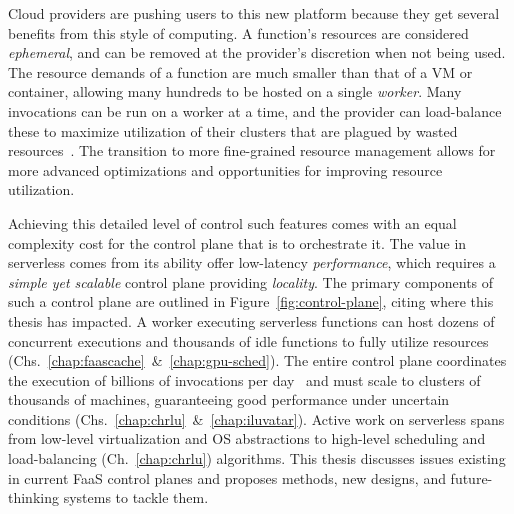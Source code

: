Cloud providers are pushing users to this new platform because they get several benefits from this style of computing.
A function's resources are considered \emph{ephemeral}, and can be removed at the provider's discretion when not being used.
The resource demands of a function are much smaller than that of a VM or container, allowing many hundreds to be hosted on a single \emph{worker}.
Many invocations can be run on a worker at a time, and the provider can load-balance these to maximize utilization of their clusters that are plagued by wasted resources~\cite{fuerst2020cloud,fuerst2022memory,wang2021smartharvest,serverless-harvest-sosp21,harvest-osdi20}.
The transition to more fine-grained resource management allows for more advanced optimizations and opportunities for improving resource utilization.

Achieving this detailed level of control such features comes with an equal complexity cost for the control plane that is to orchestrate it.
The value in serverless comes from its ability offer low-latency \emph{performance}, which requires a \emph{simple yet scalable} control plane providing \emph{locality}.
The primary components of such a control plane are outlined in Figure~\ref{fig:control-plane}, citing where this thesis has impacted.
A worker executing serverless functions can host dozens of concurrent executions and thousands of idle functions to fully utilize resources (Chs.~\ref{chap:faascache}~\&~\ref{chap:gpu-sched}).
The entire control plane coordinates the execution of billions of invocations per day~\cite{sahraei2023xfaas} and must scale to clusters of thousands of machines, guaranteeing good performance under uncertain conditions (Chs.~\ref{chap:chrlu}~\&~\ref{chap:iluvatar}).
Active work on serverless spans from low-level virtualization and OS abstractions to high-level scheduling and load-balancing (Ch.~\ref{chap:chrlu}) algorithms.
This thesis discusses issues existing in current FaaS control planes and proposes methods, new designs, and future-thinking systems to tackle them.

